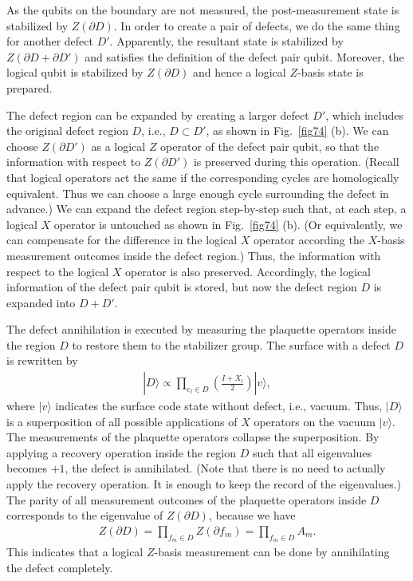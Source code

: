 As the qubits on the boundary are not measured, the post-measurement state is stabilized by $Z(\partial D)$.
In order to create a pair of defects, we do the same thing for another defect $D'$.
Apparently, the resultant state is stabilized by $Z(\partial D + \partial D')$ and satisfies the definition of the defect pair qubit. 
Moreover, the logical qubit is stabilized by $Z(\partial D)$ and hence a logical $Z$-basis state is prepared.

The defect region can be expanded by creating a larger defect $D'$, which includes the original defect region $D$, i.e., $D \subset D'$, 
as shown in Fig.~\ref{fig74} (b).
We can choose $Z(\partial D')$ as a logical $Z$ operator of the defect pair qubit, so that the information with respect to $Z(\partial D')$ is preserved during this operation.
(Recall that logical operators act the same if the corresponding cycles are homologically equivalent. Thus we can choose a large enough cycle 
surrounding the defect in advance.)
We can expand the defect region step-by-step such that, at each step, a logical $X$ operator is untouched as shown in Fig.~\ref{fig74} (b).
(Or equivalently, we can compensate for the difference in the logical $X$ operator according the $X$-basis measurement outcomes inside the defect region.)
Thus, the information with respect to the logical $X$ operator is also preserved.
Accordingly, the logical information of the defect pair qubit is stored, but now the defect region $D$ is expanded into $D+D'$.

The defect annihilation is executed by measuring the plaquette operators inside the region $D$ to restore them to the stabilizer group.
The surface with a defect $D$ is rewritten by
\begin{eqnarray}
|D\rangle \propto \prod _{e_l \in D} \left(\frac{I+X_{l}}{2} \right) |v\rangle,
\end{eqnarray}
where $|v\rangle$ indicates the surface code state without defect, i.e., vacuum.
Thus, $|D\rangle$ is a superposition of all possible applications of $X$ operators on the vacuum $|v\rangle$.
The measurements of the plaquette operators collapse the superposition.
By applying a recovery operation inside the region $D$ such that all eigenvalues becomes $+1$, the defect is annihilated.
(Note that there is no need to actually apply the recovery operation. It is enough to keep the record of the eigenvalues.)
The parity of all measurement outcomes of the plaquette operators inside $D$ corresponds to the eigenvalue of $Z(\partial D)$, because we have 
\begin{eqnarray}
Z(\partial D) = \prod _{f_m \in D} Z(\partial f_m)= \prod _{f_m \in D} A_m.
\end{eqnarray}
This indicates that a logical $Z$-basis measurement can be done by annihilating the defect completely.

